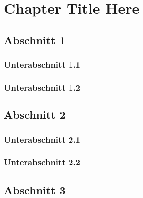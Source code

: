 
\chapter{Chapter Title Here} %

\label{ChapterX}

\section{Abschnitt 1}

\subsection{Unterabschnitt 1.1}



\subsection{Unterabschnitt 1.2}



\section{Abschnitt 2}


\subsection{Unterabschnitt 2.1}


\subsection{Unterabschnitt 2.2}


\section{Abschnitt 3}
